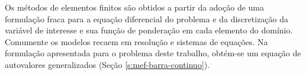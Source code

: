 \documentclass[12pt]{report}
\begin{document}
Os métodos de elementos finitos são obtidos a partir da adoção de uma formulação fraca para a equação diferencial do problema e da discretização da variável de interesse e sua função de ponderação em cada elemento do domínio. Comumente os modelos recaem em resolução e sistemas de equações. Na formulação apresentada para o problema deste trabalho, obtém-se um equação de autovalores generalizados (Seção \ref{s:mef-barra-continuo}).
\end{document}

